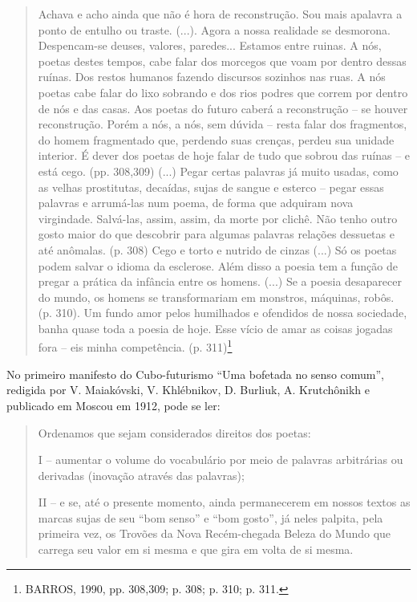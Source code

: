 \begin{quote}
Achava e acho ainda que não é hora de reconstrução. Sou mais apalavra a
ponto de entulho ou traste. (...). Agora a nossa realidade se desmorona.
Despencam-se deuses, valores, paredes... Estamos entre ruinas. A nós,
poetas destes tempos, cabe falar dos morcegos que voam por dentro dessas
ruínas. Dos restos humanos fazendo discursos sozinhos nas ruas. A nós
poetas cabe falar do lixo sobrando e dos rios podres que correm por
dentro de nós e das casas. Aos poetas do futuro caberá a reconstrução --
se houver reconstrução. Porém a nós, a nós, sem dúvida -- resta falar
dos fragmentos, do homem fragmentado que, perdendo suas crenças, perdeu
sua unidade interior. É dever dos poetas de hoje falar de tudo que
sobrou das ruínas -- e está cego. (pp. 308,309) (...) Pegar certas
palavras já muito usadas, como as velhas prostitutas, decaídas, sujas de
sangue e esterco -- pegar essas palavras e arrumá-las num poema, de
forma que adquiram nova virgindade. Salvá-las, assim, assim, da morte
por clichê. Não tenho outro gosto maior do que descobrir para algumas
palavras relações dessuetas e até anômalas. (p. 308) Cego e torto e
nutrido de cinzas (...) Só os poetas podem salvar o idioma da esclerose.
Além disso a poesia tem a função de pregar a prática da infância entre
os homens. (...) Se a poesia desaparecer do mundo, os homens se
transformariam em monstros, máquinas, robôs. (p. 310). Um fundo amor
pelos humilhados e ofendidos de nossa sociedade, banha quase toda a
poesia de hoje. Esse vício de amar as coisas jogadas fora -- eis minha
competência. (p. 311)\footnote{BARROS, 1990, pp. 308,309; p. 308; p.
  310; p. 311.}
\end{quote}

No primeiro manifesto do Cubo-futurismo ``Uma bofetada no senso comum'',
redigida por V. Maiakóvski, V. Khlébnikov, D. Burliuk, A. Krutchônikh e
publicado em Moscou em 1912, pode se ler:

\begin{quote}
Ordenamos que sejam considerados direitos dos poetas:

I -- aumentar o volume do vocabulário por meio de palavras arbitrárias
ou derivadas (inovação através das palavras);

II -- e se, até o presente momento, ainda permanecerem em nossos textos
as marcas sujas de seu ``bom senso'' e ``bom gosto'', já neles palpita,
pela primeira vez, os Trovões da Nova Recém-chegada Beleza do Mundo que
carrega seu valor em si mesma e que gira em volta de si mesma.
\end{quote}

